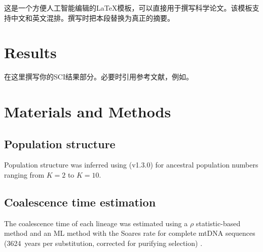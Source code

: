 \documentclass[12pt]{article}
\begin{document}
\MakeManuscriptTitle

\begin{manuscriptabstract}
这是一个方便人工智能编辑的\LaTeX 模板，可以直接用于撰写科学论文。该模板支持中文和英文混排。撰写时把本段替换为真正的摘要。
\end{manuscriptabstract}

\section{Results}
在这里撰写你的SCI结果部分。必要时引用参考文献，例如\parencite{aton2025}。


\section{Materials and Methods}

\subsection{Population structure}
Population structure was inferred using  (v1.3.0)
for ancestral population numbers ranging from
$K = 2$ to $K = 10$.

\subsection{Coalescence time estimation}
The coalescence time of each lineage was estimated using a $\rho$ statistic-based
method \parencite{forster1996} and an ML method \parencite{behar2012} with the
Soares rate for complete mtDNA sequences (\SI{3624}{years} per substitution,
corrected for purifying selection) \parencite{soares2009}.

\printbibliography[title={References}]
\end{document}
